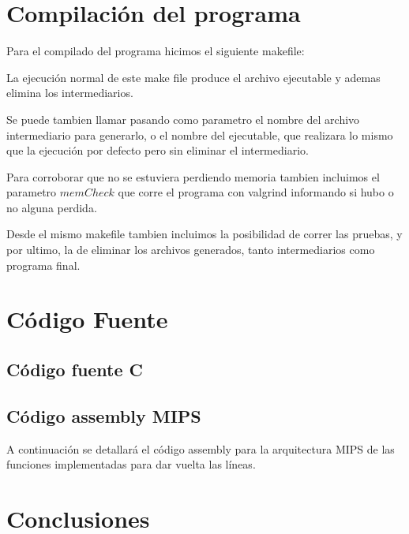 \documentclass{article}
\begin{document}
\newpage

\section{Compilación del programa}

Para el compilado del programa hicimos el siguiente makefile:



La ejecución normal de este make file produce el archivo ejecutable y ademas elimina los intermediarios.

Se puede tambien llamar pasando como parametro el nombre del archivo intermediario para generarlo, o el nombre del ejecutable, que realizara lo mismo que la ejecución por defecto pero sin eliminar el intermediario.

Para corroborar que no se estuviera perdiendo memoria tambien incluimos el parametro \(memCheck\) que corre el programa con valgrind informando si hubo o no alguna perdida.

Desde el mismo makefile tambien incluimos la posibilidad de correr las pruebas, y por ultimo, la de eliminar los archivos generados, tanto intermediarios como programa final.

\section{C\'odigo Fuente}

\subsection{C\'odigo fuente C}





\subsection{C\'odigo assembly MIPS}

A continuaci\'on se detallará el c\'odigo assembly para la arquitectura MIPS de las funciones implementadas para dar vuelta las l\'ineas.



\section{Conclusiones}
\end{document}

